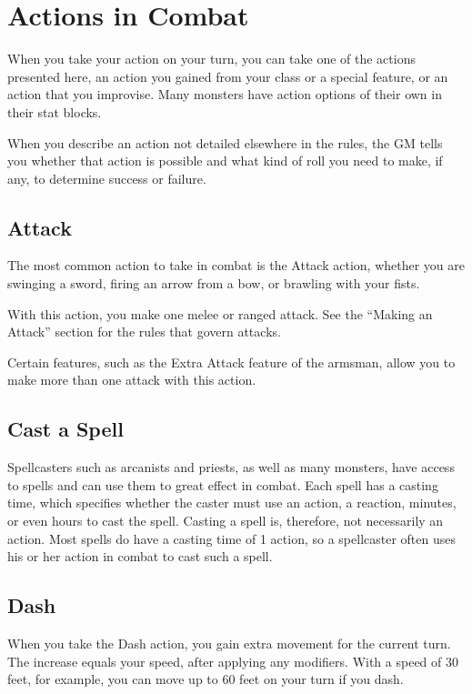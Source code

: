 \section{Actions in Combat}

When you take your action on your turn, you can take one of the actions presented here, an action you gained from your class or a special feature, or an action that you improvise. Many monsters have action options of their own in their stat blocks.

When you describe an action not detailed elsewhere in the rules, the GM tells you whether that action is possible and what kind of roll you need to make, if any, to determine success or failure.

\subsection{Attack}

The most common action to take in combat is the Attack action, whether you are swinging a sword, firing an arrow from a bow, or brawling with your fists.

With this action, you make one melee or ranged attack. See the “Making an Attack” section for the rules that govern attacks.

Certain features, such as the Extra Attack feature of the armsman, allow you to make more than one attack with this action.

\subsection{Cast a Spell}

Spellcasters such as arcanists and priests, as well as many monsters, have access to spells and can use them to great effect in combat. Each spell has a casting time, which specifies whether the caster must use an action, a reaction, minutes, or even hours to cast the spell. Casting a spell is, therefore, not necessarily an action. Most spells do have a casting time of 1 action, so a spellcaster often uses his or her action in combat to cast such a spell.

\subsection{Dash}

When you take the Dash action, you gain extra movement for the current turn. The increase equals your speed, after applying any modifiers. With a speed of 30 feet, for example, you can move up to 60 feet on your turn if you dash.


